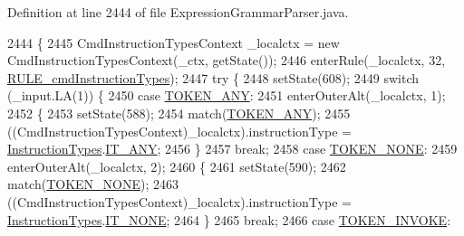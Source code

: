 Definition at line 2444 of file Expression\+Grammar\+Parser.\+java.


\begin{DoxyCode}
2444                                                                                             \{
2445     CmdInstructionTypesContext \_localctx = \textcolor{keyword}{new} CmdInstructionTypesContext(\_ctx, getState());
2446     enterRule(\_localctx, 32, \hyperlink{classgov_1_1nasa_1_1jpf_1_1inspector_1_1server_1_1expression_1_1parser_1_1_expression_grammar_parser_ab98b090d95afbb9162385f39d50e05fb}{RULE\_cmdInstructionTypes});
2447     \textcolor{keywordflow}{try} \{
2448       setState(608);
2449       \textcolor{keywordflow}{switch} (\_input.LA(1)) \{
2450       \textcolor{keywordflow}{case} \hyperlink{classgov_1_1nasa_1_1jpf_1_1inspector_1_1server_1_1expression_1_1parser_1_1_expression_grammar_parser_a21f8df7c638568302922694eab614972}{TOKEN\_ANY}:
2451         enterOuterAlt(\_localctx, 1);
2452         \{
2453         setState(588);
2454         match(\hyperlink{classgov_1_1nasa_1_1jpf_1_1inspector_1_1server_1_1expression_1_1parser_1_1_expression_grammar_parser_a21f8df7c638568302922694eab614972}{TOKEN\_ANY});
2455          ((CmdInstructionTypesContext)\_localctx).instructionType =  
      \hyperlink{enumgov_1_1nasa_1_1jpf_1_1inspector_1_1interfaces_1_1_instruction_types}{InstructionTypes}.\hyperlink{enumgov_1_1nasa_1_1jpf_1_1inspector_1_1interfaces_1_1_instruction_types_aad3f4c8aaddc54deef4cdfb64608db7c}{IT\_ANY}; 
2456         \}
2457         \textcolor{keywordflow}{break};
2458       \textcolor{keywordflow}{case} \hyperlink{classgov_1_1nasa_1_1jpf_1_1inspector_1_1server_1_1expression_1_1parser_1_1_expression_grammar_parser_a580a0b6ec039745e3490c9a5ebfb425f}{TOKEN\_NONE}:
2459         enterOuterAlt(\_localctx, 2);
2460         \{
2461         setState(590);
2462         match(\hyperlink{classgov_1_1nasa_1_1jpf_1_1inspector_1_1server_1_1expression_1_1parser_1_1_expression_grammar_parser_a580a0b6ec039745e3490c9a5ebfb425f}{TOKEN\_NONE});
2463          ((CmdInstructionTypesContext)\_localctx).instructionType =  
      \hyperlink{enumgov_1_1nasa_1_1jpf_1_1inspector_1_1interfaces_1_1_instruction_types}{InstructionTypes}.\hyperlink{enumgov_1_1nasa_1_1jpf_1_1inspector_1_1interfaces_1_1_instruction_types_abf9c9b21c4c2e4711034843f22ce87b1}{IT\_NONE}; 
2464         \}
2465         \textcolor{keywordflow}{break};
2466       \textcolor{keywordflow}{case} \hyperlink{classgov_1_1nasa_1_1jpf_1_1inspector_1_1server_1_1expression_1_1parser_1_1_expression_grammar_parser_abe5d5e0e9942bab31e8a350177829d75}{TOKEN\_INVOKE}:

\end{DoxyCode}
